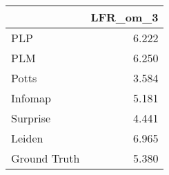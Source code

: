 \begin{tabular}{lr}
\toprule
{} & LFR_om_3 \\
\midrule
PLP          &    6.222 \\
PLM          &    6.250 \\
Potts        &    3.584 \\
Infomap      &    5.181 \\
Surprise     &    4.441 \\
Leiden       &    6.965 \\
Ground Truth &    5.380 \\
\bottomrule
\end{tabular}
